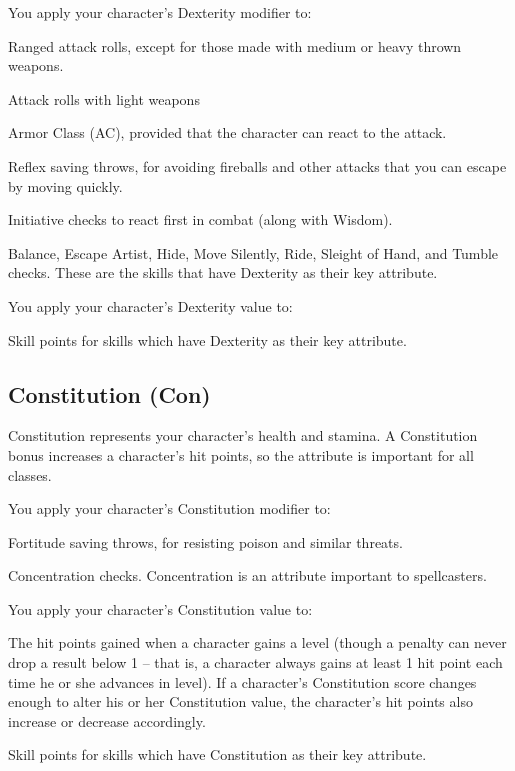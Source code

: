 You apply your character's Dexterity modifier to:
\begin{itemize*}
\item Ranged attack rolls, except for those made with medium or heavy thrown weapons.
\item Attack rolls with light weapons
\item Armor Class (AC), provided that the character can react to the attack.
\item Reflex saving throws, for avoiding fireballs and other attacks that you can escape by moving quickly.
\item Initiative checks to react first in combat (along with Wisdom).
 \item Balance, Escape Artist, Hide, Move Silently, Ride, Sleight of Hand, and Tumble checks.  These are the skills that have Dexterity as their key attribute.
\end{itemize*}
You apply your character's Dexterity value to:
\begin{itemize*}
\item Skill points for skills which have Dexterity as their key attribute.
\end{itemize*}

\subsection{Constitution (Con)}
Constitution represents your character's health and stamina. A Constitution bonus increases a character's hit points, so the attribute is important for all classes.

You apply your character's Constitution modifier to:
\begin{itemize*}
\item Fortitude saving throws, for resisting poison and similar threats.
\item Concentration checks. Concentration is an attribute important to spellcasters.
\end{itemize*}

\par You apply your character's Constitution value to:
\begin{itemize*}
\item The hit points gained when a character gains a level (though a penalty can never drop a result below 1 -- that is, a character always gains at least 1 hit point each time he or she advances in level). If a character's Constitution score changes enough to alter his or her Constitution value, the character's hit points also increase or decrease accordingly.
\item Skill points for skills which have Constitution as their key attribute.
\end{itemize*}

